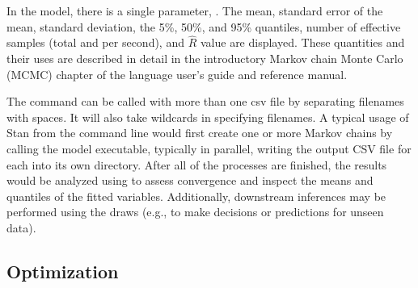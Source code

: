 In the  model, there is a single parameter,
. The mean, standard error of the mean, standard
deviation, the 5\%, 50\%, and 95\% quantiles, number of effective
samples (total and per second), and $\hat{R}$ value are displayed.
These quantities and their uses are described in detail in the
introductory Markov chain Monte Carlo (MCMC) chapter of the language
user's guide and reference manual.

The command  can be called with more than one csv file
by separating filenames with spaces. It will also take wildcards in
specifying filenames. A typical usage of Stan from the command line
would first create one or more Markov chains by calling the model
executable, typically in parallel, writing the output CSV file for
each into its own directory.  After all of the processes are
finished, the results would be analyzed using  to assess
convergence and inspect the means and quantiles of the fitted
variables.  Additionally, downstream inferences may be performed using
the draws (e.g., to make decisions or predictions for unseen data).

\subsection{Optimization}

